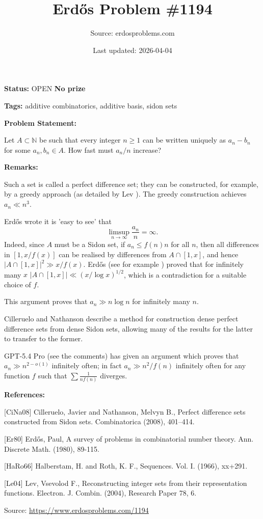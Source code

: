 \documentclass{article}
\title{Erd\H{o}s Problem \#1194}
\date{Last updated: 2026-04-04}
\author{Source: erdosproblems.com}
\begin{document}
\maketitle

\noindent\textbf{Status:} OPEN \quad \textbf{No prize}

\noindent\textbf{Tags:} additive combinatorics, additive basis, sidon sets

\medskip
\noindent\textbf{Problem Statement:}

Let $A\subset\mathbb{N}$ be such that every integer $n\geq 1$ can be written uniquely as $a_n-b_n$ for some $a_n,b_n\in A$. How fast must $a_n/n$ increase?

\bigskip
\noindent\textbf{Remarks:}

Such a set is called a perfect difference set; they can be constructed, for example, by a greedy approach (as detailed by Lev \cite{Le04}). The greedy construction achieves $a_n\ll n^3$.

Erd\H{o}s \cite{Er80} wrote it is 'easy to see' that\[\limsup_{n\to \infty}\frac{a_n}{n}=\infty.\]Indeed, since $A$ must be a Sidon set, if $a_n \leq f(n)n$ for all $n$, then all differences in $[1,x/f(x)]$ can be realised by differences from $A\cap [1,x]$, and hence $\lvert A\cap [1,x]\rvert^2 \gg x/f(x)$. Erd\H{o}s (see for example \cite{HaRo66}) proved that for infinitely many $x$ $\lvert A\cap [1,x]\rvert \ll (x/\log x)^{1/2}$, which is a contradiction for a suitable choice of $f$.

This argument proves that $a_n\gg n\log n$ for infinitely many $n$.

Cilleruelo and Nathanson \cite{CiNa08} describe a method for construction dense perfect difference sets from dense Sidon sets, allowing many of the results for the latter to transfer to the former.

GPT-5.4 Pro (see the comments) has given an argument which proves that $a_n\gg n^{2-o(1)}$ infinitely often; in fact $a_n \gg n^2/f(n)$ infinitely often for any function $f$ such that $\sum \frac{1}{nf(n)}$ diverges.

\bigskip
\noindent\textbf{References:}

[CiNa08] Cilleruelo, Javier and Nathanson, Melvyn B., Perfect difference sets constructed from Sidon sets. Combinatorica (2008), 401--414.
 
 [Er80] Erd\H{o}s, Paul, A survey of problems in combinatorial number theory. Ann. Discrete Math. (1980), 89-115.
 
 [HaRo66] Halberstam, H. and Roth, K. F., Sequences. {V}ol. I. (1966), xx+291.
 
 [Le04] Lev, Vsevolod F., Reconstructing integer sets from their representation
functions. Electron. J. Combin. (2004), Research Paper 78, 6.

\bigskip
\noindent\small{Source: \url{https://www.erdosproblems.com/1194}}
\end{document}
